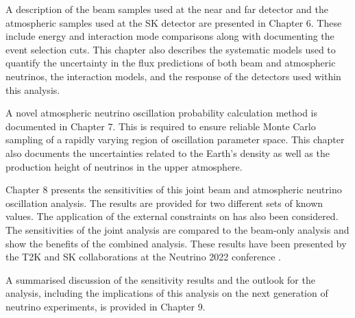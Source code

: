 A description of the beam samples used at the near and far detector and the atmospheric samples used at the SK detector are presented in Chapter 6. These include energy and interaction mode comparisons along with documenting the event selection cuts. This chapter also describes the systematic models used to quantify the uncertainty in the flux predictions of both beam and atmospheric neutrinos, the interaction models, and the response of the detectors used within this analysis.

A novel atmospheric neutrino oscillation probability calculation method is documented in Chapter 7. This is required to ensure reliable Monte Carlo sampling of a rapidly varying region of oscillation parameter space. This chapter also documents the uncertainties related to the Earth's density as well as the production height of neutrinos in the upper atmosphere.

Chapter 8 presents the sensitivities of this joint beam and atmospheric neutrino oscillation analysis.
The results are provided for two different sets of known values. The application of the external constraints on  has also been considered. The sensitivities of the joint analysis are compared to the beam-only analysis and show the benefits of the combined analysis. These results have been presented by the T2K and SK collaborations at the Neutrino 2022 conference \cite{Bronner2022-wd}.

A summarised discussion of the sensitivity results and the outlook for the analysis, including the implications of this analysis on the next generation of neutrino experiments, is provided in Chapter 9.
